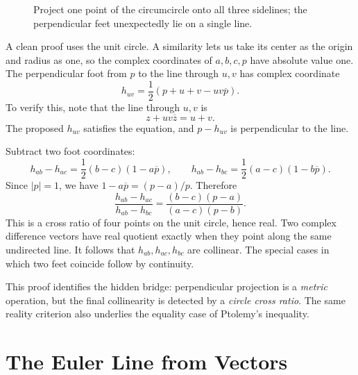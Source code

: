 \begin{figure}[H]
\centering
{}
\caption{Project one point of the circumcircle onto all three sidelines; the perpendicular feet unexpectedly lie on a single line.}
\end{figure}

A clean proof uses the unit circle. A similarity lets us take its center as the origin and radius as one, so the complex coordinates of \(a,b,c,p\) have absolute value one. The perpendicular foot from \(p\) to the line through \(u,v\) has complex coordinate
\[
 \boxed{h_{uv}=\frac12(p+u+v-uv\overline p).}
\]
To verify this, note that the line through \(u,v\) is
\[
 z+uv\overline z=u+v.
\]
The proposed \(h_{uv}\) satisfies the equation, and \(p-h_{uv}\) is perpendicular to the line.

Subtract two foot coordinates:
\[
 h_{ab}-h_{ac}=\frac12(b-c)(1-a\overline p),\qquad
 h_{ab}-h_{bc}=\frac12(a-c)(1-b\overline p).
\]
Since \(|p|=1\), we have \(1-a\overline p=(p-a)/p\). Therefore
\[
 \frac{h_{ab}-h_{ac}}{h_{ab}-h_{bc}}
 =\frac{(b-c)(p-a)}{(a-c)(p-b)}.
\]
This is a cross ratio of four points on the unit circle, hence real. Two complex difference vectors have real quotient exactly when they point along the same undirected line. It follows that \(h_{ab},h_{ac},h_{bc}\) are collinear. The special cases in which two feet coincide follow by continuity.

This proof identifies the hidden bridge: perpendicular projection is a \emph{metric} operation, but the final collinearity is detected by a \emph{circle cross ratio}. The same reality criterion also underlies the equality case of Ptolemy's inequality.

\section{The Euler Line from Vectors}

